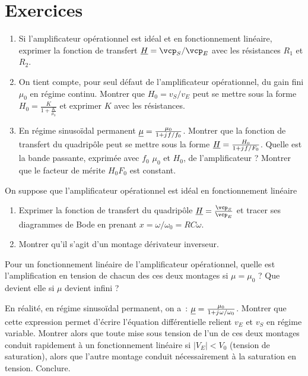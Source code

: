 \section{Exercices}
\begin{exercice}
	\begin{enumerate}
		\item Si l'amplificateur opérationnel est idéal et en fonctionnement linéaire, exprimer la fonction de transfert $\Hc = \vcp_S/\vcp_E$ avec les résistances $R_1$ et $R_2$.
		\item On tient compte, pour seul défaut de l'amplificateur opérationnel, du gain fini $\mu_0$ en régime continu. Montrer que $H_0 = v_S / v_E$ peut se mettre sous la forme $H_0 = \frac{K}{1+\frac{K}{\mu_0}}$ et exprimer $K$ avec les résistances.
		\item En régime sinusoïdal permanent $\underline{\mu} = \frac{\mu_0}{1+ {j\mkern1mu} f/f_0}$. Montrer que la fonction de transfert du quadripôle peut se mettre sous la forme $\underline{H} = \frac{H_0}{1+{j\mkern1mu} f/F_0}$. Quelle est la bande passante, exprimée avec $f_0$ $\mu_0$ et $H_0$,  de l'amplificateur ? Montrer que le facteur de mérite $H_0F_0$ est constant.
	\end{enumerate}
\end{exercice}
\begin{exercice}
	On suppose que l'amplificateur opérationnel est idéal en fonctionnement linéaire
	\begin{enumerate}
		\item Exprimer la fonction de transfert du quadripôle $\Hc = \frac{\vcp_S}{\vcp_E}$ et tracer ses diagrammes de Bode en prenant $x = \omega/\omega_0=RC\omega$.
		\item Montrer qu'il s'agit d'un montage dérivateur inverseur. 
	\end{enumerate}
\end{exercice}
\begin{exercice}
	Pour un fonctionnement linéaire de l'amplificateur opérationnel, quelle est l'amplification en tension de chacun des ces deux montages si $\mu = \mu_0$ ? Que devient elle si $\mu$ devient infini ? 
	
	En réalité, en régime sinusoïdal permanent, on a~: $\underline{\mu} = \frac{\mu_0}{1+{j\mkern1mu} \omega/\omega_0}$. Montrer que cette expression permet d'écrire l'équation différentielle relient $v_E$ et $v_S$ en régime variable. Montrer alors que toute mise sous tension de l'un de ces deux montages conduit rapidement à un fonctionnement linéaire si $\mid V_E \mid < V_0$ (tension de saturation), alors que l'autre montage conduit nécessairement à la saturation en tension. Conclure.
\end{exercice}
